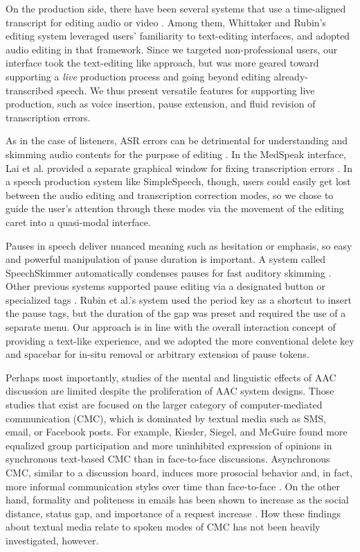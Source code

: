 On the production side, there have been several systems that use a time-aligned transcript for editing audio \cite{rubin,whittaker_semantic,yoon} or video \cite{Berthouzoz:2012,casares}. 
Among them, Whittaker and Rubin's editing system leveraged users' familiarity to text-editing interfaces, and adopted audio editing in that framework. 
Since we targeted non-professional users, our interface took the text-editing like approach, but was more geared toward supporting a \emph{live} production process and going beyond editing already-transcribed speech. 
We thus present versatile features for supporting live production, such as voice insertion, pause extension, and fluid revision of transcription errors.

As in the case of listeners, ASR errors can be detrimental for understanding and skimming audio contents for the purpose of editing \cite{halverson1999beauty}. 
In the MedSpeak interface, Lai et al. provided a separate graphical window for fixing transcription errors \cite{Lai:1997}. 
In a speech production system like SimpleSpeech, though, users could easily get lost between the audio editing and transcription correction modes, so we chose to guide the user's attention through these modes via the movement of the editing caret into a quasi-modal interface.

Pauses in speech deliver nuanced meaning such as hesitation or emphasis, so easy and powerful manipulation of pause duration is important. 
A system called SpeechSkimmer automatically condenses pauses for fast auditory skimming \cite{arons:1993}. 
Other previous systems supported pause editing via a designated button \cite{Berthouzoz:2012} or specialized tags \cite{rubin}. 
Rubin et al.'s system used the period key as a shortcut to insert the pause tags, but the duration of the gap was preset and required the use of a separate menu. 
Our approach is in line with the overall interaction concept of providing a text-like experience, and we adopted the more conventional delete key and spacebar for in-situ removal or arbitrary extension of pause tokens.

Perhaps most importantly, studies of the mental and linguistic effects of AAC discussion are limited despite the proliferation of AAC system designs.
Those studies that exist are focused on the larger category of computer-mediated communication (CMC), which is dominated by textual media such as SMS, email, or Facebook posts.
For example, Kiesler, Siegel, and McGuire \cite{kiesler} found more equalized group participation and more uninhibited expression of opinions in synchronous text-based CMC than in face-to-face discussions.
Asynchronous CMC, similar to a discussion board, induces more prosocial behavior and, in fact, more informal communication styles over time than face-to-face \cite{walther}.
On the other hand, formality and politeness in emails has been shown to increase as the social distance, status gap, and importance of a request increase \cite{cho}.
How these findings about textual media relate to spoken modes of CMC has not been heavily investigated, however.